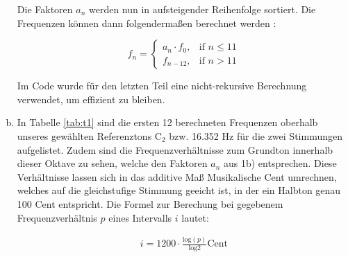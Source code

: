 \begin{enumerate}[a)]
Die Faktoren $a_n$ werden nun in aufsteigender Reihenfolge sortiert. Die Frequenzen können dann folgendermaßen berechnet werden :

\[
    f_n = 
\begin{cases}
    a_n \cdot f_0,& \text{if } n\leq 11 \\
    f_{n-12},&\text{if } n> 11
\end{cases}  
\]

Im Code wurde für den letzten Teil eine nicht-rekursive Berechnung verwendet, um effizient zu bleiben.

\item

In Tabelle \ref{tab:t1} sind die ersten 12 berechneten Frequenzen oberhalb unseres gewählten Referenztons C$_{2}$ bzw. 16.352 Hz für die zwei Stimmungen aufgelistet. Zudem sind die Frequenzverhältnisse zum Grundton innerhalb dieser Oktave zu sehen, welche den Faktoren $a_n$ aus 1b) entsprechen. Diese Verhältnisse lassen sich in das additive Maß \glqq Musikalische Cent \grqq umrechnen, welches auf die gleichstufige Stimmung geeicht ist, in der ein Halbton genau 100 Cent entspricht. Die Formel zur Berechung bei gegebenem Frequenzverhältnis $p$ eines Intervalls $i$ lautet:

\begin{align*}
    i = 1200 \cdot \frac{\mathrm{log}(p)}{\mathrm{log} 2} \mathrm{Cent}
\end{align*}





\end{enumerate}
